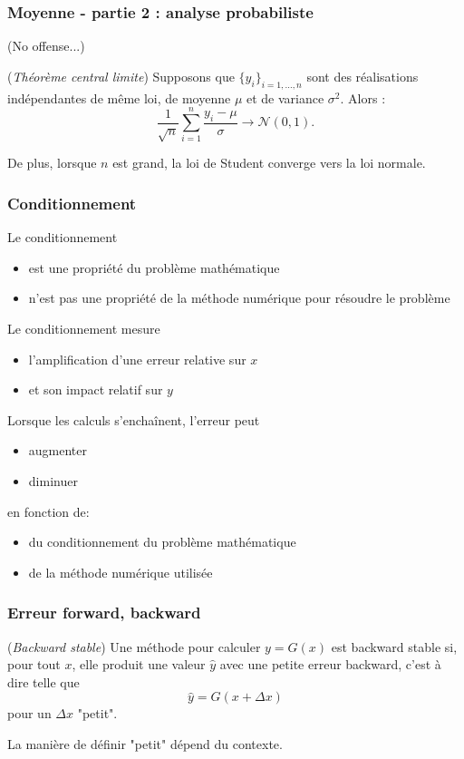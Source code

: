 \documentclass{beamer}
\begin{document}
\begin{frame}[containsverbatim]
\frametitle{Moyenne - partie 2 : analyse probabiliste}

(No offense...)

\begin{theorem}
(\emph{Théorème central limite})
Supposons que $\{y_i\}_{i=1,\ldots,n}$ sont des réalisations indépendantes de 
même loi, de moyenne $\mu$ et de variance $\sigma^2$. 
Alors :
$$
\frac{1}{\sqrt{n}} \sum_{i=1}^n \frac{y_i-\mu}{\sigma} \rightarrow \mathcal{N}(0,1).
$$
\end{theorem}

De plus, lorsque $n$ est grand, la loi de Student converge vers la loi 
normale. 

\end{frame}


\begin{frame}
\frametitle{Conditionnement}

Le conditionnement 
\begin{itemize}
\item est une propriété du problème mathématique
\item n'est pas une propriété de la méthode numérique pour résoudre le problème
\end{itemize}

Le conditionnement mesure 
\begin{itemize}
\item l'amplification d'une erreur relative sur $x$
\item et son impact relatif sur $y$
\end{itemize}

Lorsque les calculs s'enchaînent, l'erreur peut 
\begin{itemize}
\item augmenter
\item diminuer
\end{itemize}
en fonction de:
\begin{itemize}
\item du conditionnement du problème mathématique
\item de la méthode numérique utilisée
\end{itemize}

\end{frame}


\begin{frame}
\frametitle{Erreur forward, backward}

\begin{definition}
(\emph{Backward stable})
Une méthode pour calculer $y=G(x)$ est backward stable si, pour 
tout $x$, elle produit une valeur $\hat{y}$ avec une petite erreur backward, 
c'est à dire telle que 
$$
\hat{y} = G(x+\Delta x)
$$
pour un $\Delta x$ "petit".
\end{definition}

La manière de définir "petit" dépend du contexte.

\end{frame}
\end{document}
